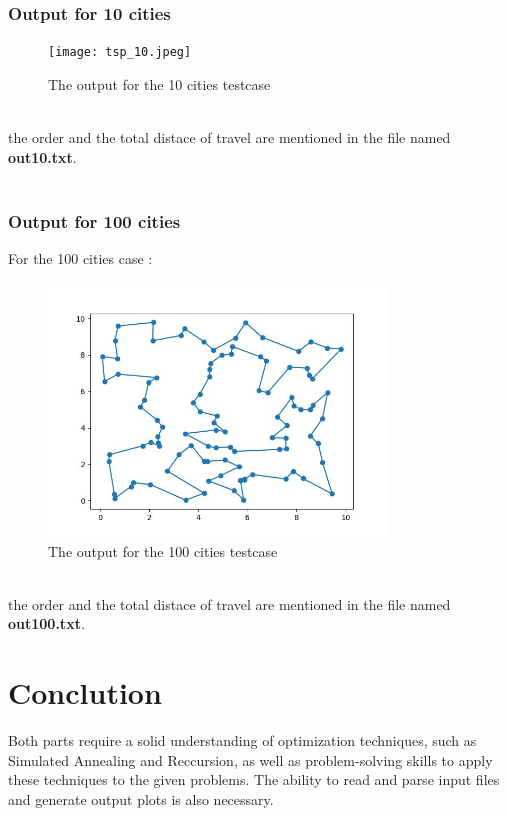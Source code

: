 \documentclass[titlepage, 11pt]{article}
\begin{document}

\subsubsection{Output for 10 cities}
\begin{figure}[ht]
    \centering
    \texttt{[image: tsp\_10.jpeg]}
    \caption{The output for the 10 cities testcase}
    \label{fig:tsp 10 jpeg}
\end{figure}
\\ 
the order and the total distace of travel are mentioned in the file named \textbf{out10.txt}.
\\
\\
\subsubsection{Output for 100 cities}
For the 100 cities case :
\begin{figure}[ht]
    \centering
    \includegraphics[width=0.8\textwidth]{tsp_100.jpeg}
    \caption{The output for the 100 cities testcase}
    \label{fig:tsp 100 jpeg}
\end{figure}
\\
the order and the total distace of travel are mentioned in the file named \textbf{out100.txt}.

\section{Conclution}

Both parts require a solid understanding of optimization techniques, such as Simulated Annealing and Reccursion, as well as problem-solving skills to apply these techniques to the given problems. The ability to read and parse input files and generate output plots is also necessary.
\end{document}
